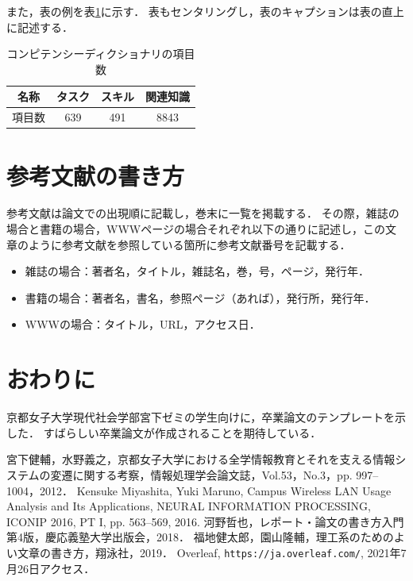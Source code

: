 \documentclass[a4paper,twocolumn,10pt]{ltjsarticle}
\begin{document}
また，表の例を表\ref{tab:competency}に示す．
表もセンタリングし，表のキャプションは表の直上に記述する．

\begin{table}[htb]
 \begin{center}
  \caption{コンピテンシーディクショナリの項目数}
  \label{tab:competency}
  \begin{tabular}{cccc}
   \hline
   名称 & タスク & スキル & 関連知識\\
   \hline
   項目数 & 639 & 491 & 8843\\
   \hline
  \end{tabular}
 \end{center}
\end{table}

\section{参考文献の書き方}

参考文献は論文での出現順に記載し，巻末に一覧を掲載する．
その際，雑誌の場合\cite{refjournal1,refjournal2}と書籍の場合\cite{refbook1,refbook2}，WWWページの場合\cite{refwww}それぞれ以下の通りに記述し，この文章のように参考文献を参照している箇所に参考文献番号を記載する．

\begin{itemize}
 \item 雑誌の場合：著者名，タイトル，雑誌名，巻，号，ページ，発行年．
 \item 書籍の場合：著者名，書名，参照ページ（あれば），発行所，発行年．
 \item WWWの場合：タイトル，URL，アクセス日．
\end{itemize}

\section{おわりに}

京都女子大学現代社会学部宮下ゼミの学生向けに，卒業論文のテンプレートを示した．
すばらしい卒業論文が作成されることを期待している．

\begin{thebibliography}{99}
  宮下健輔，水野義之，京都女子大学における全学情報教育とそれを支える情報システムの変遷に関する考察，情報処理学会論文誌，Vol.53，No.3，pp. 997--1004，2012．
  Kensuke Miyashita, Yuki Maruno, Campus Wireless LAN Usage Analysis and Its Applications, NEURAL INFORMATION PROCESSING, ICONIP 2016, PT I, pp. 563--569, 2016.
  河野哲也，レポート・論文の書き方入門 第4版，慶応義塾大学出版会，2018．
  福地健太郎，園山隆輔，理工系のためのよい文章の書き方，翔泳社，2019．
  Overleaf, {\tt https://ja.overleaf.com/}, 2021年7月26日アクセス．
\end{thebibliography}
\end{document}
